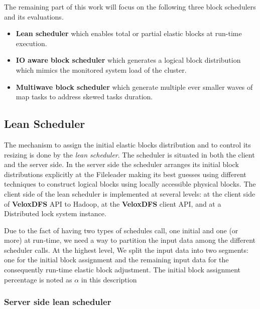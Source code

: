 The remaining part of this work will focus on the following three block
schedulers and its evaluations. 

\begin{itemize}

    \item \textbf{Lean scheduler} which enables total or partial elastic blocks
      at run-time execution.

    \item \textbf{IO aware block scheduler} which generates a logical block
      distribution which mimics the monitored system load of the cluster.

    \item \textbf{Multiwave block scheduler} which generate multiple ever
      smaller waves of map tasks to address skewed tasks duration.

\end{itemize}

\subsection{Lean Scheduler}

The mechanism to assign the initial elastic blocks distribution and to control
its resizing is done by the \textit{lean scheduler}. The scheduler is situated
in both the client and the server side. In the server side the scheduler
arranges its initial block distributions explicitly at the Fileleader making
its best guesses using different techniques to construct logical blocks using
locally accessible physical blocks. The client side of the lean scheduler is
implemented at several levels: at the client side of \textbf{VeloxDFS} API to
Hadoop, at the \textbf{VeloxDFS} client API, and at a Distributed lock system
instance. 

Due to the fact of having two types of schedules call, one initial and one (or
more) at run-time, we need a way to partition the input data among the
different scheduler calls. At the highest level, We split the input data into
two segments: one for the initial block assignment and the remaining input data
for the consequently run-time elastic block adjustment. The initial block
assignment percentage is noted as $\alpha$ in this description

\subsubsection{Server side lean scheduler}

